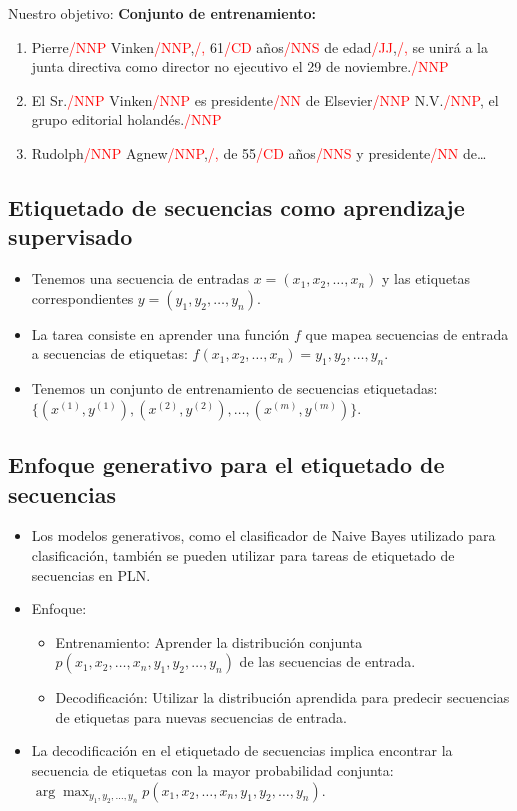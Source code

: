 Nuestro objetivo:
\textbf{Conjunto de entrenamiento:}
\begin{enumerate}
  \item Pierre\textcolor{red}{/NNP} Vinken\textcolor{red}{/NNP},\textcolor{red}{/,} 61\textcolor{red}{/CD} años\textcolor{red}{/NNS} de edad\textcolor{red}{/JJ},\textcolor{red}{/,} se unirá a la junta directiva como director no ejecutivo el 29 de noviembre.\textcolor{red}{/NNP}
  \item El Sr.\textcolor{red}{/NNP} Vinken\textcolor{red}{/NNP} es presidente\textcolor{red}{/NN} de Elsevier\textcolor{red}{/NNP} N.V.\textcolor{red}{/NNP}, el grupo editorial holandés.\textcolor{red}{/NNP}
  \item Rudolph\textcolor{red}{/NNP} Agnew\textcolor{red}{/NNP},\textcolor{red}{/,} de 55\textcolor{red}{/CD} años\textcolor{red}{/NNS} y presidente\textcolor{red}{/NN} de\ldots
\end{enumerate}

\subsection{Etiquetado de secuencias como aprendizaje supervisado}

\begin{itemize}
  \item Tenemos una secuencia de entradas $x = (x_1, x_2, \ldots, x_n)$ y las etiquetas correspondientes $y = (y_1, y_2, \ldots, y_n)$.
  \item La tarea consiste en aprender una función $f$ que mapea secuencias de entrada a secuencias de etiquetas: $f(x_1,x_2, \ldots, x_n) = y_1, y_2, \ldots, y_n$.
  \item Tenemos un conjunto de entrenamiento de secuencias etiquetadas: $\{(x^{(1)}, y^{(1)}), (x^{(2)}, y^{(2)}), \ldots, (x^{(m)}, y^{(m)})\}$.
\end{itemize}

\subsection{Enfoque generativo para el etiquetado de secuencias}

\begin{itemize}
  \item Los modelos generativos, como el clasificador de Naive Bayes utilizado para clasificación, también se pueden utilizar para tareas de etiquetado de secuencias en PLN.
  \item Enfoque:
  \begin{itemize}
    \item Entrenamiento: Aprender la distribución conjunta $p(x_1,x_2, \ldots, x_n,y_1, y_2, \ldots, y_n)$ de las secuencias de entrada.
    \item Decodificación: Utilizar la distribución aprendida para predecir secuencias de etiquetas para nuevas secuencias de entrada.
  \end{itemize}
  \item La decodificación en el etiquetado de secuencias implica encontrar la secuencia de etiquetas con la mayor probabilidad conjunta: $\arg\max_{y_1, y_2, \ldots, y_n}p(x_1,x_2, \ldots, x_n,y_1, y_2, \ldots, y_n)$.
\end{itemize}

